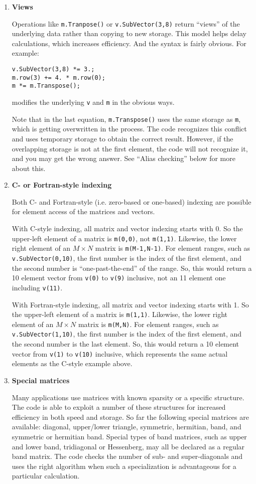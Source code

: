 \documentclass[twoside,letterpaper,11pt]{article}
\renewcommand{\tt}[1]{{\texttt {#1}}}
\begin{document}
\begin{enumerate}
\item
\textbf{Views}

Operations like \tt{m.Tranpose()} or \tt{v.SubVector(3,8)}
return ``views'' of the underlying data rather than copying to new storage.  
This model helps delay calculations, which increases efficiency.  And the syntax
is fairly obvious.  For example:
\begin{verbatim}
v.SubVector(3,8) *= 3.;
m.row(3) += 4. * m.row(0);
m *= m.Transpose();
\end{verbatim}
modifies the underlying \tt{v} and \tt{m} in the obvious ways.

Note that in the last equation, \tt{m.Transpose()} uses the same storage as
\tt{m}, which is getting overwritten in the process.  The code recognizes 
this conflict and uses temporary storage to obtain the correct result.
However, if the overlapping storage is not at the first element, the code will not
recognize it, and you may get the wrong answer. 
See ``Alias checking'' below for more about this.

\item
\textbf{C- or Fortran-style indexing}

Both C- and Fortran-style (i.e. zero-based or one-based) indexing are possible for
element access of the matrices and vectors.

With C-style indexing, all matrix and vector indexing starts with 0.  
So the upper-left element of a matrix is \tt{m(0,0)}, not \tt{m(1,1)}. 
Likewise, the lower right element of an $M \times N$ matrix is \tt{m(M-1,N-1)}.
For element ranges, such as \tt{v.SubVector(0,10)}, the first number is the 
index of the first element, and the second number is ``one-past-the-end'' of 
the range.  So, this would return a 10 element vector from \tt{v(0)} to
\tt{v(9)} inclusive, not an 11 element one including \tt{v(11)}.

With Fortran-style indexing, all matrix and vector indexing starts with 1.
So the upper-left element of a matrix is \tt{m(1,1)}.  Likewise, the lower right
element of an $M \times N$ matrix is \tt{m(M,N)}.  For element ranges, such as
\tt{v.SubVector(1,10)}, the first number is the index of the first element, and
the second number is the last element.  So, this would return a 10 element vector
from \tt{v(1)} to \tt{v(10)} inclusive, which represents the same actual elements 
as the C-style example above.

\item
\textbf{Special matrices}

Many applications use matrices with known sparsity or a specific structure.  
The code is able to exploit a number of these structures for increased
efficiency in both speed and storage.  So far the following special matrices are
available: diagonal, upper/lower triangle, symmetric, hermitian, band, and 
symmetric or hermitian band.  
Special types of band matrices, such as 
upper and lower band, tridiagonal or Hessenberg, may all be declared as a 
regular band matrix.  The code checks the number of sub- and super-diagonals 
and uses the right algorithm when such a specialization is advantageous for a 
particular calculation.


\end{enumerate}
\end{document}
